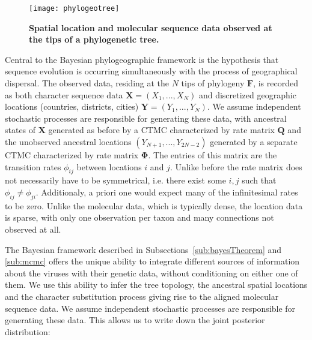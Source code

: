 \begin{figure}[H]
\centering
\texttt{[image: phylogeotree]} 
\caption{
{ \footnotesize 
{\bf Spatial location and molecular sequence data observed at the tips of a phylogenetic tree.} 
}%
}
\label{fig:phylogeotree}
\end{figure}

Central to the Bayesian phylogeographic framework is the hypothesis that sequence evolution is occurring simultaneously with the process of geographical dispersal. 
The observed data, residing at the $N$ tips of phylogeny $\mathbf{F}$, is recorded as both character sequence data $\mathbf{X}=(X_{1},...,X_{N})$ and discretized geographic locations (countries, districts, cities) $\mathbf{Y}=(Y_{1},...,Y_{N})$.
We assume independent stochastic processes are responsible for generating these data, with ancestral states of $\mathbf{X}$ generated as before by a CTMC characterized by rate matrix $\mathbf{Q}$ and the unobserved ancestral locations $(Y_{N+1},...,Y_{2N-2})$ generated by a separate CTMC characterized by rate matrix $\mathbf{\Phi}$.
The entries of this matrix are the transition rates $\phi_{ij}$ between locations $i$ and $j$.
Unlike before the rate matrix does not necessarily have to be symmetrical, i.e. there exist some $i,j$ such that $\phi_{ij}\neq\phi_{ji}$.
Additionaly, a priori one would expect many of the infinitesimal rates to be zero. 
Unlike the molecular data, which is typically dense, the location data is sparse, with only one observation per taxon and many connections not observed at all.

The Bayesian framework described in Subsections~\ref{sub:bayesTheorem} and \ref{sub:mcmc} offers the unique ability to integrate different sources of information about the viruses with their genetic data, without conditioning on either one of them.
We use this ability to infer the tree topology, the ancestral spatial locations and the character substitution process giving rise to the aligned molecular sequence data. 
We assume independent stochastic processes are responsible for generating these data.
This allows us to write down the joint posterior distribution: 


